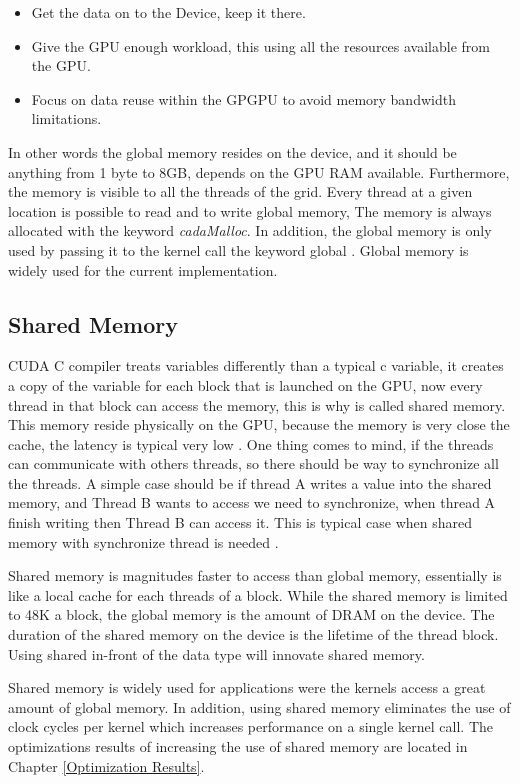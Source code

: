 \begin{itemize}
\item Get the data on to the Device, keep it there.
\item Give the GPU enough workload, this using all the resources available from the GPU.
\item Focus on data reuse within the GPGPU to avoid memory bandwidth limitations.
\end{itemize}

In other words the global memory resides on the device, and it should be anything from 1 byte to 8GB, depends on the GPU RAM available. Furthermore, the memory is visible to all the threads of the grid. Every thread at a given location is possible to read and to write global memory, The memory is always allocated with the keyword \textit{cadaMalloc}. In addition, the global memory is only used by passing it to the kernel call the keyword \twoline global \twoline \cite{design}. Global memory is widely used for the current implementation.

\subsection{Shared Memory}

CUDA C compiler treats variables differently than a typical c variable, it creates a copy of the variable for each block that is launched on the GPU, now every thread in that block can access the memory, this is why is called shared memory. This memory reside physically on the GPU, because the memory is very close the cache, the latency is typical very low \cite{example}. One thing comes to mind, if the threads can communicate with others threads, so there should be way to synchronize all the threads. A simple case should be if thread A writes a value into the shared memory, and Thread B wants to access we need to synchronize, when thread A finish writing then Thread B can access it. This is typical case when shared memory with synchronize thread is needed \cite{cook}.

Shared memory is magnitudes faster to access than global memory, essentially is like a local cache for each threads of a block. While  the shared memory is limited to 48K a block, the global memory is the amount of DRAM on the device. The duration of the shared memory on the device is the lifetime of the thread block. Using \twoline shared \twoline in-front of the data type will innovate shared memory.

Shared memory is widely used for applications were the kernels access a great amount of global memory. In addition, using shared memory eliminates the use of clock cycles per kernel which increases performance on a single kernel call. The optimizations results of increasing the use of shared memory are located in Chapter \ref{Optimization Results}.

